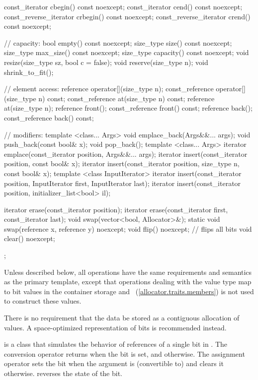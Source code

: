 \begin{codeblock}
{{    const_iterator         cbegin() const noexcept;
    const_iterator         cend() const noexcept;
    const_reverse_iterator crbegin() const noexcept;
    const_reverse_iterator crend() const noexcept;

    // capacity:
    bool      empty() const noexcept;
    size_type size() const noexcept;
    size_type max_size() const noexcept;
    size_type capacity() const noexcept;
    void      resize(size_type sz, bool c = false);
    void      reserve(size_type n);
    void      shrink_to_fit();

    // element access:
    reference       operator[](size_type n);
    const_reference operator[](size_type n) const;
    const_reference at(size_type n) const;
    reference       at(size_type n);
    reference       front();
    const_reference front() const;
    reference       back();
    const_reference back() const;

    // modifiers:
    template <class... Args> void emplace_back(Args&&... args);
    void push_back(const bool& x);
    void pop_back();
    template <class... Args> iterator emplace(const_iterator position, Args&&... args);
    iterator insert(const_iterator position, const bool& x);
    iterator insert(const_iterator position, size_type n, const bool& x);
    template <class InputIterator>
      iterator insert(const_iterator position,
                      InputIterator first, InputIterator last);
    iterator insert(const_iterator position, initializer_list<bool> il);

    iterator erase(const_iterator position);
    iterator erase(const_iterator first, const_iterator last);
    void swap(vector<bool, Allocator>&);
    static void swap(reference x, reference y) noexcept;
    void flip() noexcept;       // flips all bits
    void clear() noexcept;
  };
}
\end{codeblock}%

\pnum
Unless described below, all operations have the same requirements and
semantics as the primary  template, except that operations
dealing with the  value type map to bit values in the
container storage and
~(\ref{allocator.traits.members})
is not used to construct these values.

\pnum
There is no requirement that the data be stored as a contiguous allocation
of  values. A space-optimized representation of bits is
recommended instead.

\pnum
{}
is a class that simulates the behavior of references of a single bit in
. The conversion operator returns 
when the bit is set, and  otherwise. The assignment operator
sets the bit when the argument is (convertible to)  and
clears it otherwise.  reverses the state of the bit.

